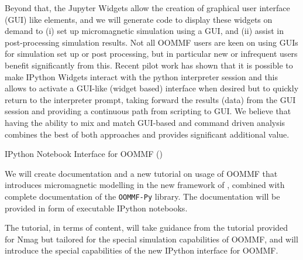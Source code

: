 \begin{workpackage}[id=UI,wphases=24-48,
  title=User Interfaces,
  PSRM=1,
  JURM=12, %
  LLRM=1, %
  SARM=1, %
  UKRM=1, %
  UBRM=1, %
  USORM=25]
\begin{tasklist}
\begin{task}[title=OOMMF case study: Extend \texttt{OOMMF-py} with IPython
    notebook attributes and GUI templates]
  Beyond that, the Jupyter Widgets allow the creation of graphical
  user interface (GUI) like elements, and we will generate code to
  display these widgets on demand to (i) set up micromagnetic
  simulation using a GUI, and (ii) assist in post-processing
  simulation results. Not all OOMMF users are keen on using GUIs for
  simulation set up or post processing, but in particular new or
  infrequent users benefit significantly from this. Recent pilot work
  has shown that it is possible to make IPython Widgets interact with
  the python interpreter session and this allows to activate a
  GUI-like (widget based) interface when desired but to quickly return
  to the interpreter prompt, taking forward the results (data) from
  the GUI session \cite{IPython-widget-GUI-demo-youtube-2014} and
  providing a continuous path from scripting to GUI. We
  believe that having the ability to mix and match GUI-based and
  command driven analysis combines the best of both approaches and
  provides significant additional value.
\end{task}
\end{tasklist}

\begin{wpdelivs}
  \begin{wpdeliv}[due=15,id=del:oommf-nb,dissem=??,nature=??]
      {IPython Notebook Interface for OOMMF (\OOMMFNB{})}
\end{wpdeliv}
\end{wpdelivs}

\begin{tasklist}
\begin{task}[title=OOMMF case study: \OOMMFNB{} tutorial and documentation]

  We will create documentation and a new tutorial on usage of OOMMF
  that introduces micromagnetic modelling in the new framework of
  \OOMMFNB{}, combined with complete documentation of the
  \texttt{OOMMF-Py} library. The documentation will be provided in
  form of executable IPython notebooks.

  The tutorial, in terms of content, will take guidance from the
  tutorial provided for Nmag \cite{Nmag-tutorial-url} but tailored for the
  special simulation capabilities of OOMMF, and will introduce the
  special capabilities of the new IPython interface for OOMMF.


\end{task}
\end{tasklist}
\end{workpackage}
